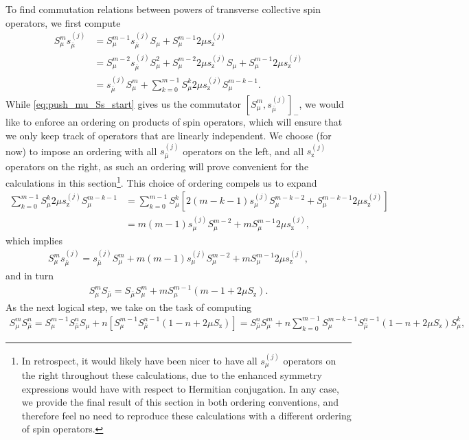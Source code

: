 \documentclass[pra,reprint,longbibliography]{revtex4-1}
\newcommand{\p}[1]{\left(#1\right)} %
\renewcommand{\sp}[1]{\left[#1\right]} %
\newcommand{\z}{\text{z}}
\newcommand{\bmu}{{\bar\mu}}
\newcommand{\1}{\mathds{1}}
\begin{document}
To find commutation relations between powers of transverse collective
spin operators, we first compute
\begin{align}
  S_\mu^m s_\bmu^{(j)}
  &= S_\mu^{m-1}s_\bmu^{(j)} S_\mu
  + S_\mu^{m-1} 2\mu s_\z^{(j)} \\
  &= S_\mu^{m-2} s_\bmu^{(j)} S_\mu^2
  + S_\mu^{m-2} 2\mu s_\z^{(j)} S_\mu
  + S_\mu^{m-1} 2\mu s_\z^{(j)} \\
  &= s_\bmu^{(j)} S_\mu^m
  + \sum_{k=0}^{m-1} S_\mu^k 2\mu s_\z^{(j)} S_\mu^{m-k-1}
  \label{eq:push_mu_Ss_start}.
\end{align}
While \eqref{eq:push_mu_Ss_start} gives us the commutator
$\sp{S_\mu^m,s_\bmu^{(j)}}_-$, we would like to enforce an ordering on
products of spin operators, which will ensure that we only keep track
of operators that are linearly independent.  We choose (for now) to
impose an ordering with all $s_\bmu^{(j)}$ operators on the left, and
all $s_\z^{(j)}$ operators on the right, as such an ordering will
prove convenient for the calculations in this section\footnote{In
  retrospect, it would likely have been nicer to have all
  $s_\mu^{(j)}$ operators on the right throughout these calculations,
  due to the enhanced symmetry expressions would have with respect to
  Hermitian conjugation.  In any case, we provide the final result of
  this section in both ordering conventions, and therefore feel no
  need to reproduce these calculations with a different ordering of
  spin operators.}.  This choice of ordering compels us to expand
\begin{align}
  \sum_{k=0}^{m-1} S_\mu^k 2\mu s_\z^{(j)} S_\mu^{m-k-1}
  &= \sum_{k=0}^{m-1} S_\mu^k
  \sp{2\p{m-k-1} s_\mu^{(j)} S_\mu^{m-k-2}
    + S_\mu^{m-k-1} 2\mu s_\z^{(j)}} \\
  &= m \p{m-1} s_\mu^{(j)} S_\mu^{m-2}
  + m S_\mu^{m-1} 2\mu s_\z^{(j)},
\end{align}
which implies
\begin{align}
  S_\mu^m s_\bmu^{(j)}
  = s_\bmu^{(j)} S_\mu^m + m \p{m-1} s_\mu^{(j)} S_\mu^{m-2}
  + m S_\mu^{m-1} 2\mu s_\z^{(j)},
  \label{eq:push_mu_Ss}
\end{align}
and in turn
\begin{align}
  S_\mu^m S_\bmu = S_\bmu S_\mu^m
  + m S_\mu^{m-1} \p{m - 1 + 2\mu S_\z}.
  \label{eq:push_mu_single}
\end{align}
As the next logical step, we take on the task of computing
\begin{align}
  S_\mu^m S_\bmu^n
  = S_\mu^{m-1} S_\bmu^n S_\mu
  + n \sp{S_\mu^{m-1} S_\bmu^{n-1} \p{1 - n + 2\mu S_\z}}
  = S_\bmu^n S_\mu^m
  + n \sum_{k=0}^{m-1} S_\mu^{m-k-1} S_\bmu^{n-1}
  \p{1 - n + 2\mu S_\z} S_\mu^k,
\end{align}
\end{document}
